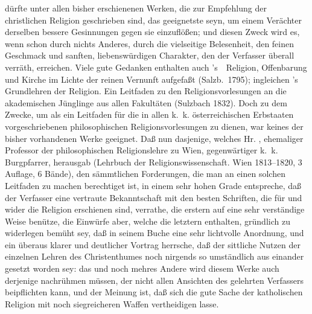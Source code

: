\begin{aufza}
\begin{aufzb}
dürfte unter allen bisher erschienenen Werken, die zur Empfehlung der christlichen Religion geschrieben sind, das geeignetste seyn, um einem Verächter derselben bessere Gesinnungen gegen sie einzuflößen; und diesen Zweck wird es, wenn schon durch nichts Anderes, durch die vielseitige Belesenheit, den feinen Geschmack und sanften, liebenswürdigen Charakter, den der Verfasser überall verräth, erreichen. Viele gute Gedanken enthalten auch 's~\ Religion, Offenbarung und  Kirche im Lichte der reinen Vernunft aufgefaßt (Salzb.\ 1795); ingleichen 's Grundlehren der Religion. Ein Leitfaden zu den Religionsvorlesungen an die akademischen Jünglinge aus allen Fakultäten (Sulzbach 1832). Doch zu dem Zwecke, um als ein Leitfaden für die in allen k.~k. österreichischen Erbstaaten vorgeschriebenen philosophischen Religionsvorlesungen zu dienen, war keines der bisher vorhandenen Werke geeignet. Daß nun dasjenige, welches Hr. , ehemaliger Professor der philosophischen Religionslehre zu Wien, gegenwärtiger k.~k. Burgpfarrer,
herausgab (Lehrbuch der Religionswissenschaft. Wien 1813--1820, 3 Auflage, 6 Bände), den sämmtlichen Forderungen, die man an einen solchen Leitfaden zu machen berechtiget ist, in einem sehr hohen Grade entspreche, daß der Verfasser eine vertraute Bekanntschaft mit den besten Schriften, die für und wider die Religion erschienen sind, verrathe, die erstern auf eine sehr verständige Weise benütze, die Einwürfe aber, welche die letztern enthalten, gründlich zu widerlegen bemüht sey, daß in seinem Buche eine sehr lichtvolle Anordnung, und ein überaus klarer und deutlicher Vortrag herrsche, daß der sittliche Nutzen der einzelnen Lehren des Christenthumes noch nirgends so umständlich aus einander gesetzt worden sey: das und noch mehres Andere wird diesem Werke auch derjenige nachrühmen müssen, der nicht allen Ansichten des gelehrten Verfassers beipflichten kann, und der Meinung ist, daß sich die gute Sache der katholischen Religion mit noch siegreicheren Waffen vertheidigen lasse.
\end{aufzb}
\end{aufza}

